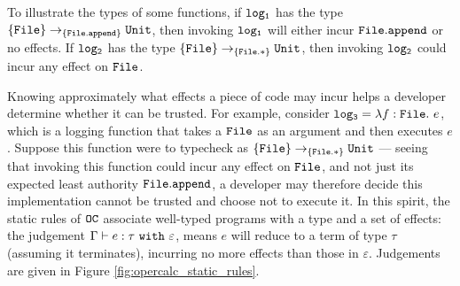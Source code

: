To illustrate the types of some functions, if $\mathtt{log_1}$ has the type $\{ \mathtt{File} \} \rightarrow_{\{\mathtt{File.append}\}} \mathtt{Unit}$, then invoking $\mathtt{log_1}$ will either incur $\mathtt{File.append}$ or no effects. If $\mathtt{log_2}$ has the type $\{ \mathtt{File} \} \rightarrow_{\{\mathtt{File.*}\}} \mathtt{Unit}$, then invoking $\mathtt{log_2}$ could incur any effect on $\mathtt{File}$.

Knowing approximately what effects a piece of code may incur helps a developer determine whether it can be trusted. For example, consider $\mathtt{log_3} = \lambda f: \mathtt{File}.~e$, which is a logging function that takes a $\mathtt{File}$ as an argument and then executes $e$. Suppose this function were to typecheck as $\{ \mathtt{File} \} \rightarrow_{\{ \mathtt{File.*} \}} \mathtt{Unit}$ --- seeing that invoking this function could incur any effect on $\mathtt{File}$, and not just its expected least authority $\mathtt{File.append}$, a developer may therefore decide this implementation cannot be trusted and choose not to execute it. In this spirit, the static rules of $\mathtt{OC}$ associate well-typed programs with a type and a set of effects: the judgement $\Gamma \vdash e: \tau~\mathtt{with}~ \varepsilon$, means $e$ will reduce to a term of type $\tau$ (assuming it terminates), incurring no more effects than those in $\varepsilon$. Judgements are given in Figure \ref{fig:opercalc_static_rules}.

